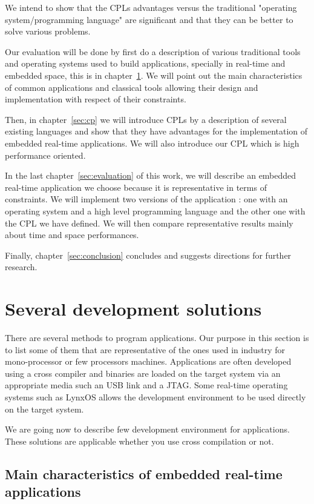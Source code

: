 \documentclass[10pt]{report}
\begin{document}
We intend to show that the CPLs advantages versus the traditional "operating system/programming language"
are significant and that they can be better to solve various problems.

Our evaluation will be done by first do a description of various traditional tools and operating systems
used to build applications, specially in real-time and embedded space, this is in chapter~\ref{sec:related}.
We will point out the main characteristics of common applications and classical tools allowing their design
and implementation with respect of their constraints.

Then, in chapter~\ref{sec:cp} we will introduce CPLs by a description of several existing languages and
show that they have advantages for the implementation of embedded real-time applications. We will also
introduce our CPL which is high performance oriented.

In the last chapter~\ref{sec:evaluation} of this work, we will describe an embedded real-time application
we choose because it is representative in terms of constraints. We will implement two versions of the
application : one with an operating system and a high level programming language and the other one
with the CPL we have defined. We will then compare representative results mainly about time and space
performances.

Finally, chapter~\ref{sec:conclusion} concludes and suggests directions for further research.

\chapter{Several development solutions}
\label{sec:related}

There are several methods to program applications. Our purpose in this section is to list some of them that are
representative of the ones used in industry for mono-processor or few processors machines. Applications are often
developed using a cross compiler and binaries are loaded on the target system via an appropriate media such
an USB link and a JTAG. Some real-time operating systems such as LynxOS allows the development environment to be
used directly on the target system.

We are going now to describe few development environment for applications. These solutions are applicable whether you use
cross compilation or not.

\section{Main characteristics of embedded real-time applications}
\end{document}
